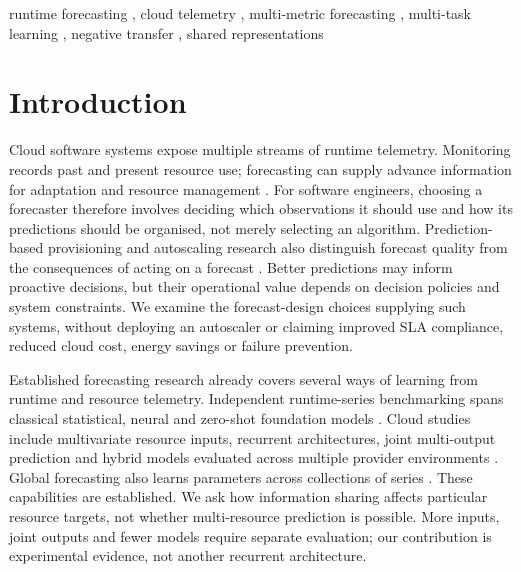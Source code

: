 \documentclass[a4paper,fleqn]{cas-dc}
\begin{document}
\begin{keywords}
runtime forecasting \sep
cloud telemetry \sep
multi-metric forecasting \sep
multi-task learning \sep
negative transfer \sep
shared representations
\end{keywords}

\maketitle

\section{Introduction}
\label{sec:introduction}

Cloud software systems expose multiple streams of runtime telemetry.
Monitoring records past and present resource use; forecasting can supply
advance information for adaptation and resource management
\citep{Taherizadeh2018Monitoring,Bauer2020SelfAware}.
For software engineers, choosing a forecaster therefore involves deciding
which observations it should use and how its predictions should be organised,
not merely selecting an algorithm. Prediction-based provisioning and
autoscaling research also distinguish forecast quality from the consequences
of acting on a forecast \citep{Calheiros2015ARIMA,Qu2018Autoscaling}.
Better predictions may inform proactive decisions, but their operational value
depends on decision policies and system constraints. We examine the
forecast-design choices supplying such systems, without deploying an
autoscaler or claiming improved SLA compliance, reduced cloud cost, energy
savings or failure prevention.

Established forecasting research already covers several ways of learning from
runtime and resource telemetry. Independent runtime-series benchmarking spans
classical statistical, neural and zero-shot foundation models
\citep{DiMenna2026RuntimeForecasting}. Cloud studies include multivariate
resource inputs, recurrent architectures, joint multi-output prediction and
hybrid models evaluated across multiple provider environments
\citep{Ullah2023CloudBiLSTM,Tripathi2025MMRP}. Global forecasting also learns
parameters across collections of series \citep{Salinas2020DeepAR}.
These capabilities are established. We ask how information sharing affects
particular resource targets, not whether multi-resource prediction is
possible. More inputs, joint outputs and fewer models require separate
evaluation; our contribution is experimental evidence, not another recurrent
architecture.
\end{document}
